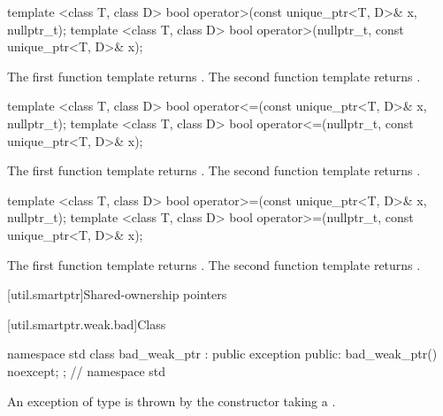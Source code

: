 %
\begin{itemdecl}
template <class T, class D>
  bool operator>(const unique_ptr<T, D>& x, nullptr_t);
template <class T, class D>
  bool operator>(nullptr_t, const unique_ptr<T, D>& x);
\end{itemdecl}

\begin{itemdescr}
\pnum
\returns
The first function template returns .
The second function template returns .
\end{itemdescr}

%
\begin{itemdecl}
template <class T, class D>
  bool operator<=(const unique_ptr<T, D>& x, nullptr_t);
template <class T, class D>
  bool operator<=(nullptr_t, const unique_ptr<T, D>& x);
\end{itemdecl}

\begin{itemdescr}
\pnum
\returns
The first function template returns .
The second function template returns .
\end{itemdescr}

%
\begin{itemdecl}
template <class T, class D>
  bool operator>=(const unique_ptr<T, D>& x, nullptr_t);
template <class T, class D>
  bool operator>=(nullptr_t, const unique_ptr<T, D>& x);
\end{itemdecl}

\begin{itemdescr}
\pnum
\returns
The first function template returns .
The second function template returns .
\end{itemdescr}

%
[util.smartptr]{Shared-ownership pointers}

[util.smartptr.weak.bad]{Class }
%
\begin{codeblock}
namespace std {
  class bad_weak_ptr : public exception {
  public:
    bad_weak_ptr() noexcept;
  };
} // namespace std
\end{codeblock}

\pnum
An exception of type  is thrown by the 
constructor taking a .

